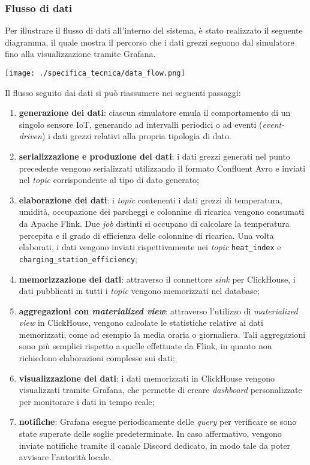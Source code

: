 \subsubsection{Flusso di dati}
Per illustrare il flusso di dati all'interno del sistema, è stato realizzato il seguente diagramma, il quale mostra il percorso che i dati grezzi seguono dal simulatore fino alla visualizzazione tramite Grafana.
\begin{center}
	\texttt{[image: ./specifica\_tecnica/data\_flow.png]}
\end{center}
\linebreak
Il flusso seguito dai dati si può riassumere nei seguenti passaggi:
\begin{enumerate}
	\item \textbf{generazione dei dati}: ciascun simulatore emula il comportamento di un singolo sensore IoT, generando ad intervalli periodici o ad eventi (\textit{event-driven}) i dati grezzi relativi alla propria tipologia di dato.
	\item \textbf{serializzazione e produzione dei dati}: i dati grezzi generati nel punto precedente vengono serializzati utilizzando il formato Confluent Avro e inviati nel \textit{topic} corrispondente al tipo di dato generato;
	\item \textbf{elaborazione dei dati}: i \textit{topic} contenenti i dati grezzi di temperatura, umidità, occupazione dei parcheggi e colonnine di ricarica vengono consumati da Apache Flink.
	      Due \textit{job} distinti si occupano di calcolare la temperatura percepita e il grado di efficienza delle colonnine di ricarica. Una volta elaborati, i dati vengono inviati rispettivamente
	      nei \textit{topic} \texttt{heat\_index} e \texttt{charging\_station\_efficiency};
	\item \textbf{memorizzazione dei dati}: attraverso il connettore \textit{sink} per ClickHouse, i dati pubblicati in tutti i \textit{topic} vengono memorizzati nel database;
	\item \textbf{aggregazioni con \textit{materialized view}}: attraverso l'utilizzo di \textit{materialized view} in ClickHouse, vengono calcolate le statistiche relative ai dati memorizzati, come ad esempio la media oraria o giornaliera.
	      Tali aggregazioni sono più semplici rispetto a quelle effettuate da Flink, in quanto non richiedono elaborazioni complesse sui dati;
	\item \textbf{visualizzazione dei dati}: i dati memorizzati in ClickHouse vengono visualizzati tramite Grafana, che permette di creare \textit{dashboard} personalizzate per monitorare i dati in tempo reale;
	\item \textbf{notifiche}: Grafana esegue periodicamente delle \textit{query} per verificare se sono state superate delle soglie predeterminate. In caso affermativo, vengono inviate notifiche tramite il canale Discord dedicato, in modo tale da poter avvisare l'autorità locale.
\end{enumerate}

